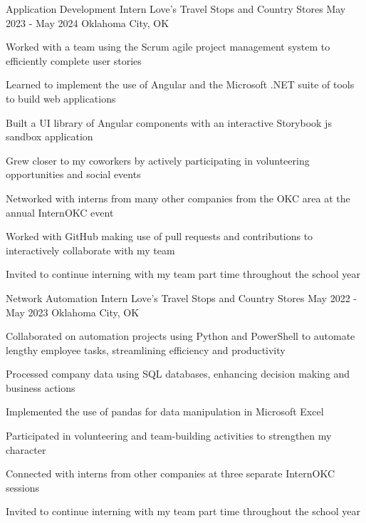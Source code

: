 \documentclass[letterpaper]{resumeconfig}
\begin{document}
\WorkExperience
    {Application Development Intern} %
    {Love's Travel Stops and Country Stores} %
    {May 2023 - May 2024} %
    {Oklahoma City, OK} %
    {
        \item Worked with a team using the Scrum agile project management system to efficiently complete user stories
        \item Learned to implement the use of Angular and the Microsoft .NET suite of tools to build web applications
        \item Built a UI library of Angular components with an interactive Storybook js sandbox application
        \item Grew closer to my coworkers by actively participating in volunteering opportunities and social events
        \item Networked with interns from many other companies from the OKC area at the annual InternOKC event
        \item Worked with GitHub making use of pull requests and contributions to interactively collaborate with my team
        \item Invited to continue interning with my team part time throughout the school year
    }
    \vspace{1em}

\WorkExperience
    {Network Automation Intern} %
    {Love's Travel Stops and Country Stores} %
    {May 2022 - May 2023} %
    {Oklahoma City, OK} %
    {
        \item Collaborated on automation projects using Python and PowerShell to automate lengthy employee tasks, streamlining efficiency and productivity
        \item Processed company data using SQL databases, enhancing decision making and business actions
        \item Implemented the use of pandas for data manipulation in Microsoft Excel
        \item Participated in volunteering and team-building activities to strengthen my character
        \item Connected with interns from other companies at three separate InternOKC sessions
        \item Invited to continue interning with my team part time throughout the school year
    }
    
\end{document}
